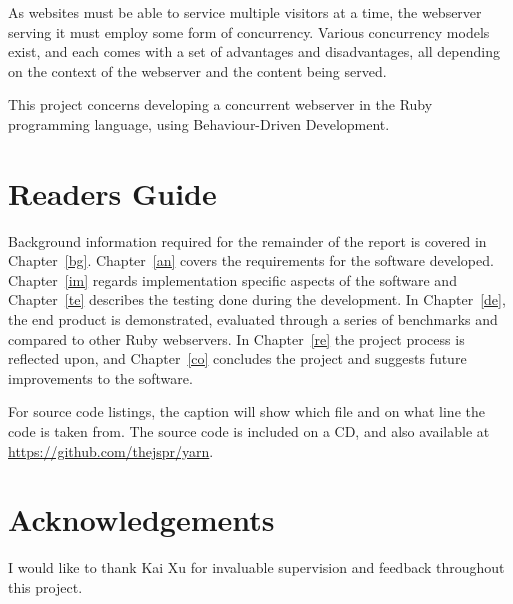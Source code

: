 %
As websites must be able to service multiple visitors at a time, the
webserver serving it must employ some form of concurrency. Various concurrency
models exist, and each comes with a set of advantages and disadvantages, all
depending on the context of the webserver and the content being served.

This project concerns developing a concurrent webserver in the Ruby
programming language, using Behaviour-Driven Development.

\section{Readers Guide}
Background information required for the remainder of the report is covered in
Chapter~\ref{bg}. Chapter~\ref{an} covers the requirements for the software
developed. Chapter~\ref{im} regards implementation specific aspects of the
software and Chapter~\ref{te} describes the testing done during the
development. In Chapter~\ref{de}, the end product is demonstrated,
evaluated through a series of benchmarks and compared to other Ruby
webservers. In Chapter~\ref{re} the project process is reflected upon, and
Chapter~\ref{co} concludes the project and suggests future improvements to the
software.

For source code listings, the caption will show which file and on what line
the code is taken from. The source code is included on a CD, and also
available at \url{https://github.com/thejspr/yarn}.

\section{Acknowledgements}
I would like to thank Kai Xu for invaluable supervision and feedback
throughout this project.
